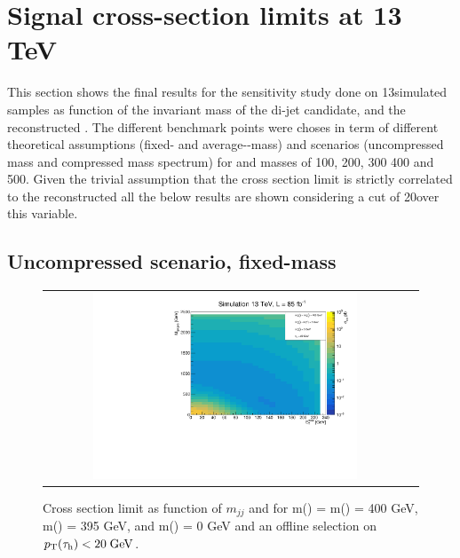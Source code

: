 \clearpage

\section{Signal cross-section limits at 13 TeV}
\label{sec::xseclim_results}

This section shows the final results for the sensitivity study done on 13\tev simulated samples as function of the invariant mass of the di-jet candidate,  \met and the reconstructed \hadtau \pt. The different benchmark points were choses in term of different theoretical assumptions (fixed- and average-\stau-mass) and scenarios (uncompressed mass and compressed mass spectrum) for \charginopm and \neutralinoone masses of 100, 200, 300 400 and 500\gev. Given the trivial assumption that the cross section limit is strictly correlated to the reconstructed \hadtau \pt all the below results are shown considering a cut of 20\gev over this variable.


\subsection*{Uncompressed scenario, fixed-\stau mass}

\FloatBarrier


\begin{figure}[tbh!]
	\centering
	\begin{tabular}{cc}
		\includegraphics[width=0.75\textwidth]{analysis/pics/JetInvMass_vs_MET_xseclim_Chargino400_Stau395_LSP000_taupt20.pdf}
	\end{tabular}
	\caption{Cross section limit as function of $m_{jj}$ and \met for m(\charginopm) = m(\neutralinotwo) = 400 GeV,  m(\stau) = 395 GeV, and m(\neutralinoone) = 0 GeV and an offline selection on $p_{\text{T}}(\tau_{\text{h}}) <  20\;\text{Ge}\kern-0.06667em\text{V}$.}
	\label{fig::JetInvMass_vs_MET_xseclim_Chargino400_Stau395_LSP000_taupt20}
\end{figure}

